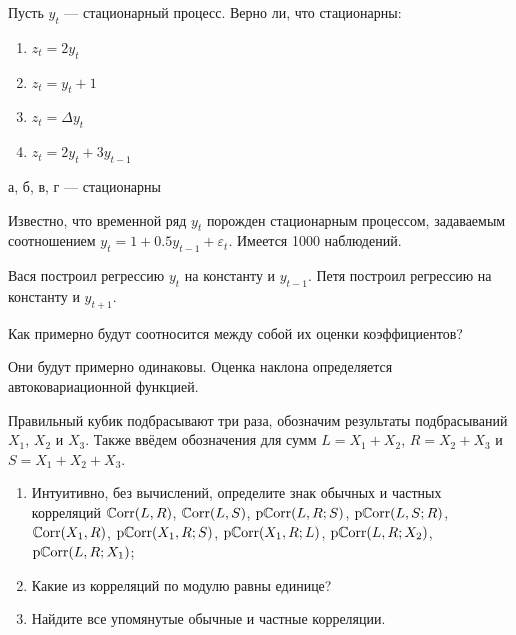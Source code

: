
\begin{problem}
Пусть $y_{t}$ — стационарный процесс. Верно ли, что стационарны:
\begin{enumerate}
\item $z_{t}=2y_{t}$
\item $z_{t}=y_{t}+1$
\item $z_{t}=\Delta y_{t}$
\item $z_{t}=2y_{t}+3y_{t-1}$
\end{enumerate}
\begin{sol}
а, б, в, г — стационарны
\end{sol}
\end{problem}





\begin{problem}
Известно, что временной ряд $y_{t}$ порожден стационарным процессом, задаваемым соотношением $y_{t}=1+0.5y_{t-1}+\varepsilon_{t}$. Имеется 1000 наблюдений.


Вася построил регрессию $y_{t}$ на константу и $y_{t-1}$. Петя построил регрессию на константу и $y_{t+1}$.


Как примерно будут соотносится между собой их оценки коэффициентов?
\begin{sol}
Они будут примерно одинаковы. Оценка наклона определяется автоковариационной функцией.
\end{sol}
\end{problem}


\begin{problem}
Правильный кубик подбрасывают три раза, обозначим результаты подбрасываний $X_1$, $X_2$ и $X_3$. Также ввёдем обозначения для сумм $L=X_1+X_2$, $R=X_2+X_3$ и $S=X_1+X_2+X_3$.
\begin{enumerate}
\item Интуитивно, без вычислений, определите знак обычных и частных корреляций $\mathbb{C}\mathrm{orr}(L, R)$, $\mathbb{C}\mathrm{orr}(L, S)$, $\mathrm{p}\mathbb{C}\mathrm{orr}(L, R; S)$, 
  $\mathrm{p}\mathbb{C}\mathrm{orr}(L, S; R)$, $\mathbb{C}\mathrm{orr}(X_1, R)$, $\mathrm{p}\mathbb{C}\mathrm{orr}(X_1, R; S)$, $\mathrm{p}\mathbb{C}\mathrm{orr}(X_1, R; L)$, $\mathrm{p}\mathbb{C}\mathrm{orr}(L, R; X_2)$, $\mathrm{p}\mathbb{C}\mathrm{orr}(L, R; X_1)$;  
\item Какие из корреляций по модулю равны единице?
\item Найдите все упомянутые обычные и частные корреляции.
\end{enumerate}
\begin{sol}

\end{sol}
\end{problem}


